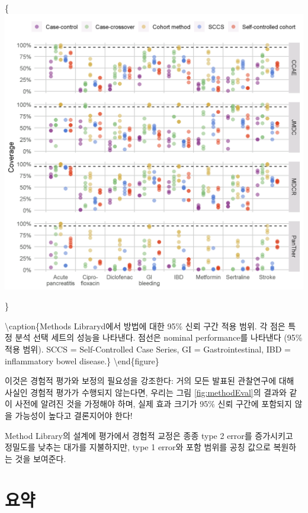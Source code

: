 \documentclass[11pt]{book}
\theoremstyle{definition}
\theoremstyle{definition}
\theoremstyle{definition}
\theoremstyle{remark}
\begin{document}
\{\centering \includegraphics[width=1\linewidth]{images/MethodValidity/methodEval}

\}

\textbackslash{}caption\{Methods Libraryd에서 방법에 대한 95\% 신뢰 구간
적용 범위. 각 점은 특정 분석 선택 세트의 성능을 나타낸다. 점선은 nominal
performance를 나타낸다 (95\% 적용 범위). SCCS = Self-Controlled Case
Series, GI = Gastrointestinal, IBD = inflammatory bowel
disease.\}\label{fig:methodEval} \textbackslash{}end\{figure\}

이것은 경험적 평가와 보정의 필요성을 강조한다: 거의 모든 발표된
관찰연구에 대해 사실인 경험적 평가가 수행되지 않는다면, 우리는 그림
\ref{fig:methodEval}의 결과와 같이 사전에 알려진 것을 가정해야 하며,
실제 효과 크기가 95\% 신뢰 구간에 포함되지 않을 가능성이 높다고
결론지어야 한다!

Method Library의 설계에 평가에서 경험적 교정은 종종 type 2 error를
증가시키고 정밀도를 낮추는 대가를 지불하지만, type 1 error와 포함 범위를
공칭 값으로 복원하는 것을 보여준다.

\section{요약}\label{-15}
\end{document}
